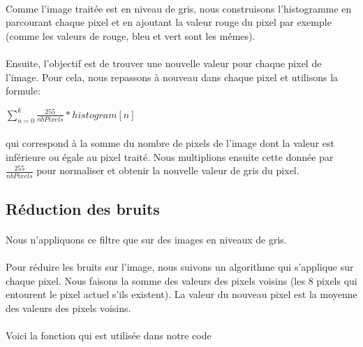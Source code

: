 \documentclass{article}
\begin{document}
\paragraph{}Comme l'image traitée est en niveau de gris, nous construisons l'histogramme en parcourant chaque pixel et en ajoutant la valeur rouge du pixel par exemple (comme les valeurs de rouge, bleu et vert sont les mêmes).

\paragraph{}Ensuite, l'objectif est de trouver une nouvelle valeur pour chaque pixel de l'image. Pour cela, nous repassons à nouveau dans chaque pixel et utilisons la formule:\newline
\begin{center}
	$\sum_{n=0}^{k}\frac{255}{nbPixels}*histogram[n]$
\end{center}

\paragraph{}qui correspond à la somme du nombre de pixels de l'image dont la valeur est inférieure ou égale au pixel traité. Nous multiplions ensuite cette donnée par $\frac{255}{nbPixels}$ pour normaliser et obtenir la nouvelle valeur de gris du pixel.


\subsection{Réduction des bruits}

\paragraph{}Nous n'appliquons ce filtre que sur des images en niveaux de gris.

\paragraph{}Pour réduire les bruits sur l'image, nous suivons un algorithme qui s'applique sur chaque pixel. Nous faisons la somme des valeurs des pixels voisins (les 8 pixels qui entourent le pixel actuel s'ils existent). La valeur du nouveau pixel est la moyenne des valeurs des pixels voisins.

\paragraph{}Voici la fonction qui est utilisée dans notre code
\end{document}
